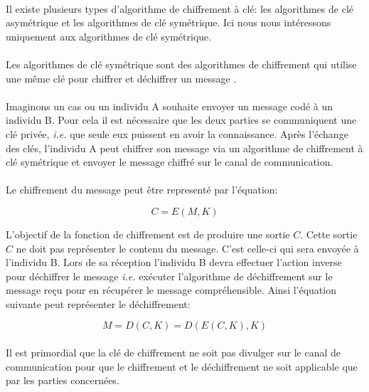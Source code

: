 \documentclass[letterpaper]{article}
\begin{document}
\paragraph{}

Il existe plusieurs types d'algorithme de chiffrement à clé: les algorithmes de clé asymétrique et les algorithmes de clé symétrique. Ici nous nous intéressons uniquement aux algorithmes de clé symétrique.

\paragraph{}

Les algorithmes de clé symétrique sont des algorithmes de chiffrement qui utilise une même clé pour chiffrer et déchiffrer un message \cite{AESIMPL}.

 \paragraph{}

Imaginons un cas ou un individu A souhaite envoyer un message codé à un individu
B. Pour cela il est nécessaire que les deux parties se communiquent une clé privée, \textit{i.e.} que seule
eux puissent en avoir la connaissance. Après l'échange des clés, l'individu A peut chiffrer son message
via un algorithme de chiffrement à clé symétrique et envoyer le message chiffré sur le canal de communication.
\paragraph{}

Le chiffrement du message peut être representé par l'équation:

\[
  C = E(M, K)
\]


L'objectif de la fonction de chiffrement est de produire une sortie $C$. Cette sortie $C$
ne doit pas représenter le contenu du message. C'est celle-ci
qui sera envoyée à l'individu B. Lors de sa réception l'individu B devra effectuer l'action
inverse pour déchiffrer le message \textit{i.e.} exécuter l'algorithme de déchiffrement sur le message reçu
pour en récupérer le message compréhensible. Ainsi l'équation suivante peut
représenter le déchiffrement:

\[
  M = D(C, K) = D(E(C, K), K)
\]

\paragraph{}
Il est primordial que la clé de chiffrement ne soit pas divulger sur le canal de communication
pour que le chiffrement et le déchiffrement ne soit applicable que par les parties concernées. 
\end{document}
